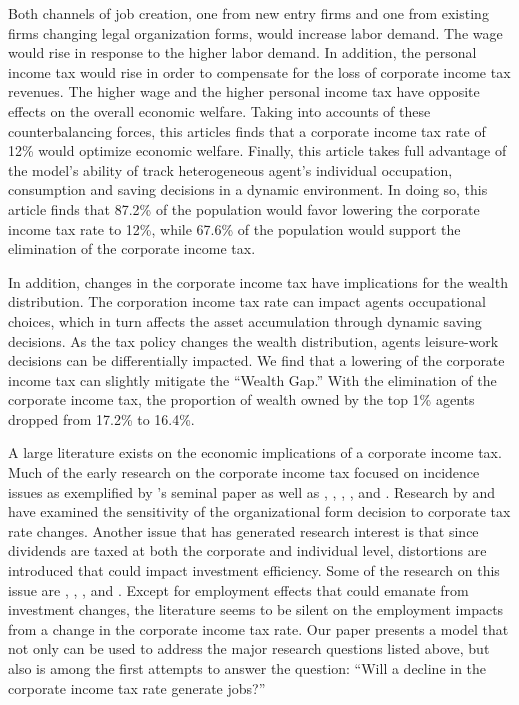 \documentclass[12pt]{article}
\begin{document}
Both channels of job creation, one from new entry firms and one from existing firms changing legal organization forms, would increase labor demand. The wage would rise in response to the higher labor demand. In addition, the personal income tax would rise in order to compensate for the loss of corporate income tax revenues. The higher wage and the higher personal income tax have opposite effects on the overall economic welfare. Taking into accounts of these counterbalancing forces, this articles finds that a corporate income tax rate of 12\% would optimize economic welfare. Finally, this article takes full advantage of the model's ability of track heterogeneous agent's individual occupation, consumption and saving decisions in a dynamic environment. In doing so, this article finds that 87.2\% of the population would favor lowering the corporate income tax rate to 12\%, while 67.6\% of the population would support the elimination of the corporate income tax.

In addition, changes in the corporate income tax have
implications for the wealth distribution. The corporation income tax rate
can impact agents occupational choices, which in turn affects the asset
accumulation through dynamic saving decisions. As the tax policy changes the
wealth distribution, agents leisure-work decisions can be differentially
impacted. We find that a lowering of the corporate income tax can slightly mitigate the ``Wealth Gap.'' With the elimination of the corporate income tax, the proportion of wealth owned by the top 1\% agents dropped from 17.2\% to 16.4\%. 


A large literature exists on the economic implications of a corporate income
tax. Much of the early research on the corporate income tax focused on
incidence issues as exemplified by \citet{Harberger1962}'s seminal paper as
well as \citet{Ballard1985}, \citet{Feldstein1978}, \citet{Feldstein1980}, %
\citet{Gravelle1989}, and \citet{Shoven1976}. Research by %
\citet{Goolsbee2004} and \citet{Gordon1994} have examined the sensitivity of
the organizational form decision to corporate tax rate changes. Another
issue that has generated research interest is that since dividends are taxed
at both the corporate and individual level, distortions are introduced that
could impact investment efficiency. Some of the research on this issue are %
\citet{Auerbach2002}, \citet{Jensen1986}, \citet{Chetty2005}, and %
\citet{Gourio2010}. Except for employment effects that could emanate from
investment changes, the literature seems to be silent on the employment
impacts from a change in the corporate income tax rate. Our paper presents a
model that not only can be used to address the major research questions
listed above, but also is among the first attempts to answer the question:
``Will a decline in the corporate income tax rate generate jobs?''
\end{document}
